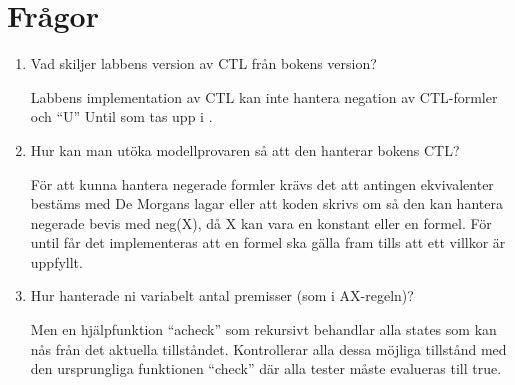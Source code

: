 \section{Frågor}
\label{sub:fragor}

\renewcommand{\labelenumi}{(\alph{enumi})}
\begin{enumerate}
\item Vad skiljer labbens version av CTL från bokens version?

Labbens implementation av CTL kan inte hantera negation av CTL-formler och “U” Until som tas upp i \cite{huth}.

\item Hur kan man utöka modellprovaren så att den hanterar bokens CTL?

För att kunna hantera negerade formler krävs det att antingen ekvivalenter bestäms med De Morgans lagar eller att koden skrivs om så den kan hantera negerade bevis med neg(X), då X kan vara en konstant eller en formel. För until får det implementeras att en formel ska gälla fram tills att ett villkor är uppfyllt.

\item Hur hanterade ni variabelt antal premisser (som i AX-regeln)?

Men en hjälpfunktion “acheck” som rekursivt behandlar alla states som kan nås från det aktuella tillståndet. Kontrollerar alla dessa möjliga tillstånd med den ursprungliga funktionen “check” där alla tester måste evalueras till true.

\end{enumerate}